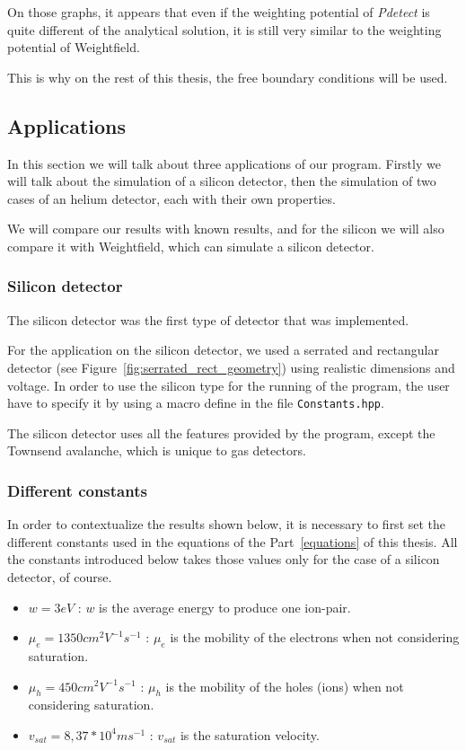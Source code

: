 \documentclass[11pt]{article}
\begin{document}
			On those graphs, it appears that even if the weighting potential of \textit{Pdetect} is quite
			different of the analytical solution, it is still very similar to the weighting potential
			of Weightfield.

			This is why on the rest of this thesis, the free boundary conditions will be used.

	\subsection{Applications}

		In this section we will talk about three applications of our program.
		Firstly we will talk about the simulation of a silicon detector, then the
		simulation of two cases of an helium detector, each with their own properties.

		We will compare our results with known results, and for the silicon we will also
		compare it with Weightfield, which can simulate a silicon detector.

		\subsubsection{Silicon detector}

			The silicon detector was the first type of detector that was implemented.

			For the application on the silicon detector, we used a serrated and rectangular detector
			(see Figure~\ref{fig:serrated_rect_geometry}) using realistic dimensions and voltage.
			In order to use the silicon type for the running of the program, the user have to specify
			it by using a macro define in the file \texttt{Constants.hpp}.

			The silicon detector uses all the features provided by the program, except the Townsend
			avalanche, which is unique to gas detectors.

			\subsubsection*{Different constants}

				In order to contextualize the results shown below, it is necessary to first set the
				different constants used in the equations of the Part~\ref{equations} of this thesis.
				All the constants introduced below takes those values only for the case of a silicon
				detector, of course.

				\begin{itemize}

					\item $w = 3 eV$ : $w$ is the average energy to produce one ion-pair.
					\item $\mu_e = 1350 cm^2V^{-1}s^{-1}$ : $\mu_e$ is the mobility of the electrons
						when not considering saturation.
					\item $\mu_h = 450 cm^2V^{-1}s^{-1}$ : $\mu_h$ is the mobility of the holes (ions)
						when not considering saturation.
					\item $v_{sat} = 8,37*10^{4} ms^{-1}$ : $v_{sat}$ is the saturation velocity.

				\end{itemize}
\end{document}
